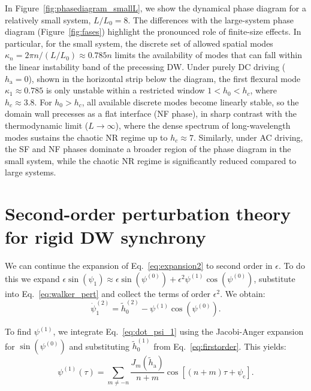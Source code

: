 \documentclass[prb,aps,twocolumn,superscriptaddress,floatfix]{revtex4-1}
\begin{document}
In Figure~\ref{fig:phasediagram_smallL}, we show the dynamical phase diagram for a relatively small system, $L/L_0=8$. The differences with the large-system phase diagram (Figure~\ref{fig:fases}) highlight the pronounced role of finite-size effects. In particular, for the small system, the discrete set of allowed spatial modes $\kappa_n = 2\pi n / (L/L_0) \approx 0.785 n$ limits the availability of modes that can fall within the linear instability band of the precessing DW. Under purely DC driving ($h_\mathrm{a} = 0$), shown in the horizontal strip below the diagram, the first flexural mode $\kappa_1 \approx 0.785$ is only unstable within a restricted window $1 < h_0 < h_c$, where $h_c \approx 3.8$. For $h_0 > h_c$, all available discrete modes become linearly stable, so the domain wall precesses as a flat interface (NF phase), in sharp contrast with the thermodynamic limit ($L\to\infty$), where the dense spectrum of long-wavelength modes sustains the chaotic NR regime up to $h_c \approx 7$. Similarly, under AC driving, the SF and NF phases dominate a broader region of the phase diagram in the small system, while the chaotic NR regime is significantly reduced compared to large systems. 




\section{Second-order perturbation theory for rigid DW synchrony}
\label{ap:segundo_orden}

We can continue the expansion of Eq.~\eqref{eq:expansion2} to second order in $\epsilon$. To do this we expand $\epsilon\sin(\psi_1) \approx \epsilon \sin\left(\psi^{(0)}\right) + \epsilon^2 \psi^{(1)} \cos\left(\psi^{(0)}\right)$, substitute into Eq.~\eqref{eq:walker_pert} and collect the terms of order $\epsilon^2$. We obtain:
%
\begin{equation}
\dot{\psi}_1^{(2)} = \tilde h_0^{(2)} - \psi^{(1)} \cos\left(\psi^{(0)}\right).
    \label{eq:dot_psi_2}    
\end{equation}

To find $\psi^{(1)}$, we integrate Eq.~\eqref{eq:dot_psi_1} using the Jacobi-Anger expansion for $\sin\left(\psi^{(0)}\right)$ and substituting $\tilde h_0^{(1)}$ from Eq.~\eqref{eq:firstorder}. This yields:
%
\begin{equation}
    \psi^{(1)}(\tau) = \sum_{m \neq -n} \frac{J_m(\tilde h_\text{a})}{n+m} \cos[(n+m)\tau + \psi_\text{c}].
\end{equation}
\end{document}
